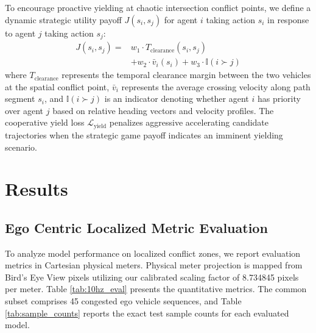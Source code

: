 \documentclass{article}
\begin{document}
To encourage proactive yielding at chaotic intersection conflict points, we define a dynamic strategic utility payoff $J(s_i, s_j)$ for agent $i$ taking action $s_i$ in response to agent $j$ taking action $s_j$:
\begin{equation}
\begin{aligned}
J(s_i, s_j) = &w_1 \cdot T_{\text{clearance}}(s_i, s_j) \\
&+ w_2 \cdot \bar{v}_i(s_i) + w_3 \cdot \mathbb{I}(i \succ j)
\end{aligned}
\end{equation}
where $T_{\text{clearance}}$ represents the temporal clearance margin between the two vehicles at the spatial conflict point, $\bar{v}_i$ represents the average crossing velocity along path segment $s_i$, and $\mathbb{I}(i \succ j)$ is an indicator denoting whether agent $i$ has priority over agent $j$ based on relative heading vectors and velocity profiles. The cooperative yield loss $\mathcal{L}_{\text{yield}}$ penalizes aggressive accelerating candidate trajectories when the strategic game payoff indicates an imminent yielding scenario.

\section{Results}

\subsection{Ego Centric Localized Metric Evaluation}
To analyze model performance on localized conflict zones, we report evaluation metrics in Cartesian physical meters. Physical meter projection is mapped from Bird's Eye View pixels utilizing our calibrated scaling factor of 8.734845 pixels per meter. Table \ref{tab:10hz_eval} presents the quantitative metrics. The common subset comprises 45 congested ego vehicle sequences, and Table \ref{tab:sample_counts} reports the exact test sample counts for each evaluated model.
\end{document}
